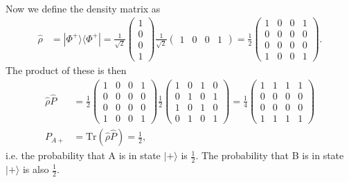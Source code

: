 \documentclass[a4paper, 11pt, normalem]{report}
\begin{document}
\begin{example}
\begin{align}
    \end{align}
    Now we define the density matrix as
    \begin{align}
        \hat{\rho} &= |\Phi^+\rangle\langle\Phi^+| = \frac{1}{\sqrt{2}}\begin{pmatrix} 1 \\ 0 \\ 0 \\ 1\end{pmatrix}\frac{1}{\sqrt{2}}\begin{pmatrix} 1 & 0 & 0 & 1\end{pmatrix} = \frac12 \begin{pmatrix} 1 & 0 & 0 & 1 \\ 0 & 0 & 0 & 0 \\0 & 0 & 0 & 0 \\ 1 & 0 & 0 & 1 \end{pmatrix}.
    \end{align}
    The product of these is then
    \begin{align}
        \hat{\rho}\hat{P} &= \frac12\begin{pmatrix} 1 & 0 & 0 & 1 \\ 0 &0&0 & 0 \\ 0 & 0 & 0 & 0 \\ 1 & 0 & 0 & 1\end{pmatrix}\frac12 \begin{pmatrix} 1 & 0 & 1 & 0 \\ 0 & 1 & 0 & 1 \\ 1 & 0 & 1 & 0 \\ 0 & 1 & 0 & 1\end{pmatrix} = \frac14\begin{pmatrix} 1&1&1&1\\0&0&0&0\\0&0&0&0\\1&1&1&1\end{pmatrix}\\
        P_{A+} &= \text{Tr}(\hat{\rho}\hat{P}) = \frac12,
    \end{align}
    i.e. the probability that A is in state $|+\rangle$ is $\frac12$.
    The probability that B is in state $|+\rangle$ is also $\frac12$.


\end{example}
\end{document}
